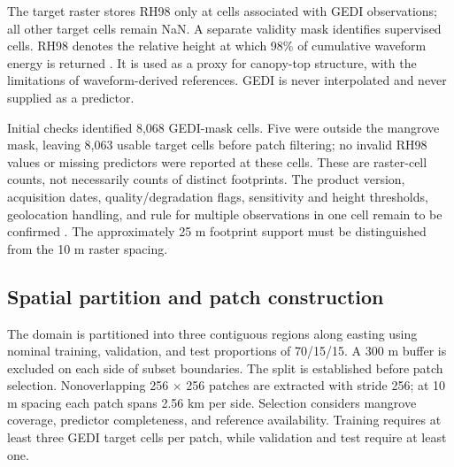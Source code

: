 The target raster stores RH98 only at cells associated with GEDI observations; all other target cells remain NaN. A separate validity mask identifies supervised cells. RH98 denotes the relative height at which 98\% of cumulative waveform energy is returned \citep{lang2023}. It is used as a proxy for canopy-top structure, with the limitations of waveform-derived references. GEDI is never interpolated and never supplied as a predictor.

Initial checks identified 8,068 GEDI-mask cells. Five were outside the mangrove mask, leaving 8,063 usable target cells before patch filtering; no invalid RH98 values or missing predictors were reported at these cells. These are raster-cell counts, not necessarily counts of distinct footprints. The product version, acquisition dates, quality/degradation flags, sensitivity and height thresholds, geolocation handling, and rule for multiple observations in one cell remain to be confirmed . The approximately 25 m footprint support \citep{dubayah2020} must be distinguished from the 10 m raster spacing.

\subsection{Spatial partition and patch construction}

The domain is partitioned into three contiguous regions along easting using nominal training, validation, and test proportions of 70/15/15. A 300 m buffer is excluded on each side of subset boundaries. The split is established before patch selection. Nonoverlapping 256 $\times$ 256 patches are extracted with stride 256; at 10 m spacing each patch spans 2.56 km per side. Selection considers mangrove coverage, predictor completeness, and reference availability. Training requires at least three GEDI target cells per patch, while validation and test require at least one.

\begin{table}[t]
\centering
\small
\setlength{\tabcolsep}{3pt}
\caption{Actual retained samples after filtering. Nominal region proportions do not describe the retained patch or reference proportions.}
\end{table}

